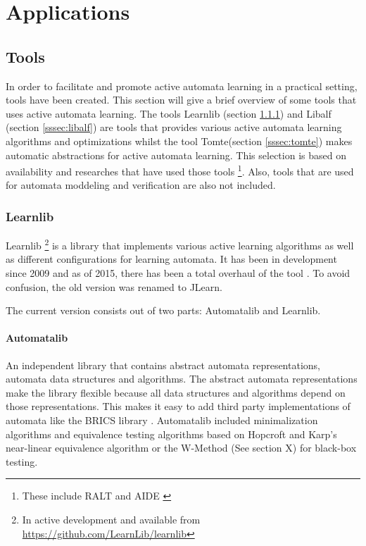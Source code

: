 \documentclass[multi,crop=false,class=article]{standalone}
\begin{document}
\section{Applications}
\label{sec:applications}

\subsection{Tools}
\label{ssec:tools}

In order to facilitate and promote active automata learning in a practical 
setting, tools have been created. This section will give a brief overview of 
some tools that uses active automata learning. The tools Learnlib (section 
\ref{sssec:learnlib}) and Libalf (section \ref{sssec:libalf}) are tools that 
provides various active automata learning algorithms and optimizations whilst 
the tool Tomte(section \ref{sssec:tomte}) makes automatic abstractions for 
active automata learning. This selection is based on availability and 
researches that have used those tools \footnote{These include 
RALT\cite{Shahbaz2014} and AIDE \cite{Cicala2016}}. Also, tools that are used 
for automata moddeling and verification are also not included.

\subsubsection{Learnlib}
\label{sssec:learnlib}

Learnlib  \footnote{In active development and available from 
\url{https://github.com/LearnLib/learnlib} } is a library that implements 
various active 
learning algorithms as well as different configurations for learning 
automata. It has been in development since 2009 \cite{Raffelt2009} and as of 
2015, there has been a total overhaul of the tool \cite{Isberner2015}. To avoid 
confusion, the old version was renamed to JLearn. 

The current version consists out of two parts: Automatalib and Learnlib.


\paragraph{Automatalib} An independent library that contains abstract 
automata representations, automata data structures and algorithms. The abstract 
automata representations make the library flexible because all data structures
and algorithms depend on those representations. This makes it easy to add 
third party implementations of automata like the BRICS library 
\cite{Alur2005}. Automatalib included minimalization 
algorithms and equivalence testing algorithms based on Hopcroft and Karp's 
near-linear equivalence algorithm \cite{hopcroft1971} or the W-Method 
(See section X) %
for black-box testing. 
\end{document}
